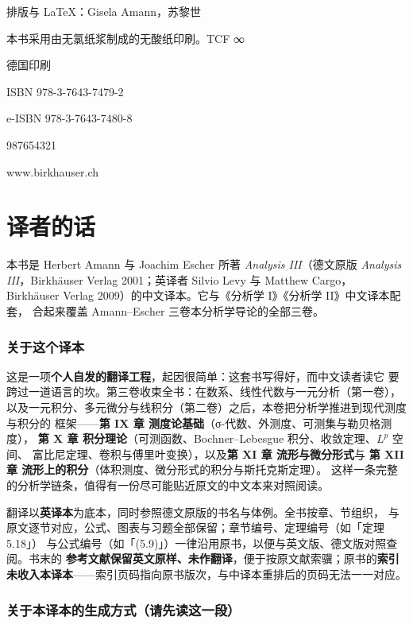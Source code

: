 排版与 LaTeX：Gisela Amann，苏黎世

本书采用由无氯纸浆制成的无酸纸印刷。TCF ∞

德国印刷

ISBN 978-3-7643-7479-2

e-ISBN 978-3-7643-7480-8

987654321

www.birkhauser.ch

\chapter*{译者的话}

本书是 Herbert Amann 与 Joachim Escher 所著 \textit{Analysis III}（德文原版
\textit{Analysis III}，Birkhäuser Verlag 2001；英译者 Silvio Levy 与 Matthew Cargo，
Birkhäuser Verlag 2009）的中文译本。它与《分析学 I》《分析学 II》中文译本配套，
合起来覆盖 Amann--Escher 三卷本分析学导论的全部三卷。

\subsection*{关于这个译本}

这是一项\textbf{个人自发的翻译工程}，起因很简单：这套书写得好，而中文读者读它
要跨过一道语言的坎。第三卷收束全书：在数系、线性代数与一元分析（第一卷），
以及一元积分、多元微分与线积分（第二卷）之后，本卷把分析学推进到现代测度与积分的
框架——\textbf{第 IX 章 测度论基础}（σ-代数、外测度、可测集与勒贝格测度），
\textbf{第 X 章 积分理论}（可测函数、Bochner--Lebesgue 积分、收敛定理、$L^p$ 空间、
富比尼定理、卷积与傅里叶变换），以及\textbf{第 XI 章 流形与微分形式}与
\textbf{第 XII 章 流形上的积分}（体积测度、微分形式的积分与斯托克斯定理）。
这样一条完整的分析学链条，值得有一份尽可能贴近原文的中文本来对照阅读。

翻译以\textbf{英译本}为底本，同时参照德文原版的书名与体例。全书按章、节组织，
与原文逐节对应，公式、图表与习题全部保留；章节编号、定理编号（如「定理 5.18」）
与公式编号（如「(5.9)」）一律沿用原书，以便与英文版、德文版对照查阅。书末的
\textbf{参考文献保留英文原样、未作翻译}，便于按原文献索骥；原书的\textbf{索引
未收入本译本}——索引页码指向原书版次，与中译本重排后的页码无法一一对应。

\subsection*{关于本译本的生成方式（请先读这一段）}

